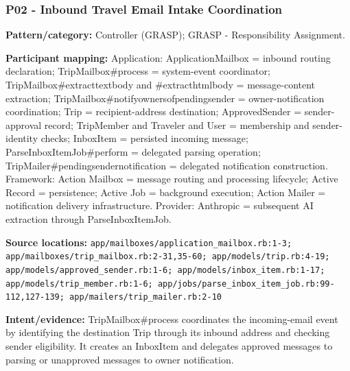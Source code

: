 \documentclass[11pt,a4paper]{article}
\renewcommand{\_}{\textunderscore\allowbreak}
\begin{document}
\subsubsection*{P02 - Inbound Travel Email Intake Coordination}
\textbf{Pattern/category:} Controller (GRASP); GRASP - Responsibility Assignment.\par
\textbf{Participant mapping:} Application: ApplicationMailbox = inbound routing declaration; TripMailbox\#process = system-event coordinator; TripMailbox\#extract\_text\_body and \#extract\_html\_body = message-content extraction; TripMailbox\#notify\_owners\_of\_pending\_sender = owner-notification coordination; Trip = recipient-address destination; ApprovedSender = sender-approval record; TripMember and Traveler and User = membership and sender-identity checks; InboxItem = persisted incoming message; ParseInboxItemJob\#perform = delegated parsing operation; TripMailer\#pending\_sender\_notification = delegated notification construction. Framework: Action Mailbox = message routing and processing lifecycle; Active Record = persistence; Active Job = background execution; Action Mailer = notification delivery infrastructure. Provider: Anthropic = subsequent AI extraction through ParseInboxItemJob.\par
\textbf{Source locations:} \nolinkurl{app/mailboxes/application_mailbox.rb:1-3; app/mailboxes/trip_mailbox.rb:2-31,35-60; app/models/trip.rb:4-19; app/models/approved_sender.rb:1-6; app/models/inbox_item.rb:1-17; app/models/trip_member.rb:1-6; app/jobs/parse_inbox_item_job.rb:99-112,127-139; app/mailers/trip_mailer.rb:2-10}\par
\textbf{Intent/evidence:} TripMailbox\#process coordinates the incoming-email event by identifying the destination Trip through its inbound address and checking sender eligibility. It creates an InboxItem and delegates approved messages to parsing or unapproved messages to owner notification.\par
\end{document}
